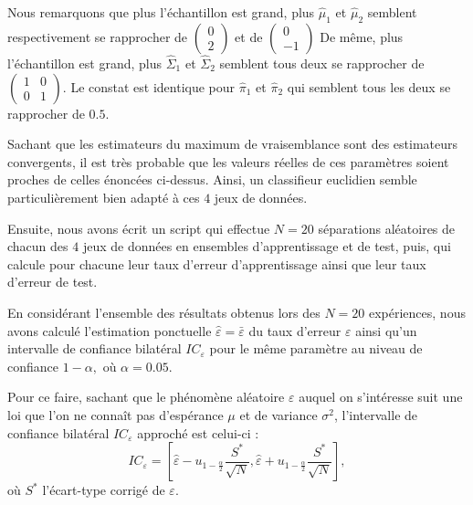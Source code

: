\documentclass{article}
\begin{document}
\begin{multicols}{2}
Nous remarquons que plus l'échantillon est grand, plus $\widehat{\mu}_1$ et $\widehat{\mu}_2$ semblent respectivement se rapprocher de $\begin{pmatrix} 0 \\ 2 \end{pmatrix}$ et de $\begin{pmatrix} 0 \\ -1 \end{pmatrix}$
De même, plus l'échantillon est grand, plus $\widehat{\Sigma}_1$  et $\widehat{\Sigma}_2$ semblent tous deux se rapprocher de $\begin{pmatrix}
  1  & 0 \\
  0 & 1  
\end{pmatrix}$. Le constat est identique pour $\widehat{\pi}_1$ et $\widehat{\pi}_2$ qui semblent tous les deux se rapprocher de $0.5$.

Sachant que les estimateurs du maximum de vraisemblance sont des estimateurs convergents, il est très probable que les valeurs réelles de ces paramètres soient proches de celles énoncées ci-dessus. Ainsi, un classifieur euclidien semble particulièrement bien adapté à ces $4$ jeux de données.

Ensuite, nous avons écrit un script qui effectue $N = 20$ séparations aléatoires de chacun des $4$ jeux de données en ensembles d’apprentissage et de test, puis, qui calcule pour chacune leur taux d’erreur d’apprentissage ainsi que leur taux d’erreur de test.

En considérant l’ensemble des résultats obtenus lors des $N = 20$ expériences, nous avons calculé l’estimation ponctuelle $\widehat{\varepsilon} = \bar{\varepsilon}$ du taux d’erreur $\varepsilon$ ainsi qu’un intervalle de confiance bilatéral $IC_\varepsilon$ pour le même paramètre au niveau de confiance $1 - \alpha,$ où $\alpha = 0.05$. 

Pour ce faire, sachant que le phénomène aléatoire $\varepsilon$ auquel on s'intéresse suit une loi que l'on ne connaît pas d'espérance $\mu$ et de variance $\sigma^2$, l'intervalle de confiance bilatéral $IC_\varepsilon$ approché est celui-ci :
\begin{equation}
	\label{eq_confidence_interval}
	IC_\varepsilon = \left[ \widehat{\varepsilon} - u_{1 - \frac{\alpha}{2}} \frac{S^{\ast}}{\sqrt{N}}, \widehat{\varepsilon} + u_{1 - \frac{\alpha}{2}} \frac{S^{\ast}}{\sqrt{N}} \right],
\end{equation}
où $S^{\ast}$ l'écart-type corrigé de $\varepsilon$.


\end{multicols}
\end{document}
